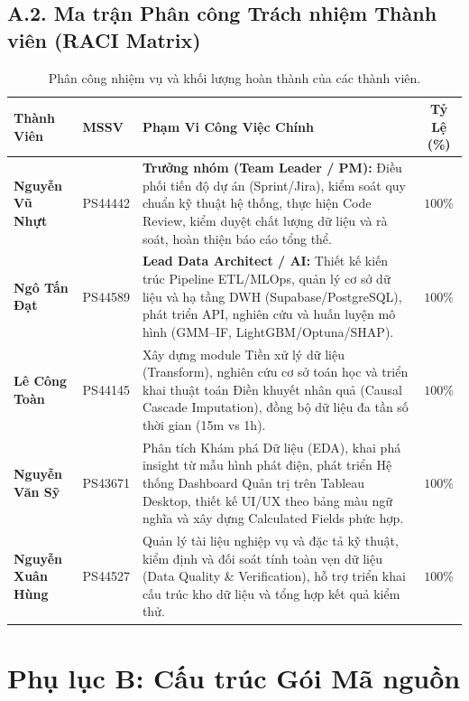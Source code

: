 \documentclass[12pt, a4paper]{report}
\begin{document}
\section*{A.2. Ma trận Phân công Trách nhiệm Thành viên (RACI Matrix)}

\begin{table}[H]
\centering
\small
\renewcommand{\arraystretch}{1}
\begin{tabularx}{\textwidth}{@{} l l X c @{}}
\toprule
\textbf{Thành Viên} & \textbf{MSSV} & \textbf{Phạm Vi Công Việc Chính} & \textbf{Tỷ Lệ (\%)} \\
\midrule
\textbf{Nguyễn Vũ Nhựt} & PS44442 & 
\textbf{Trưởng nhóm (Team Leader / PM):} Điều phối tiến độ dự án (Sprint/Jira), kiểm soát quy chuẩn kỹ thuật hệ thống, thực hiện Code Review, kiểm duyệt chất lượng dữ liệu và rà soát, hoàn thiện báo cáo tổng thể. & 
$100\%$ \\
\midrule
\textbf{Ngô Tấn Đạt} & PS44589 & 
\textbf{Lead Data Architect / AI:} Thiết kế kiến trúc Pipeline ETL/MLOps, quản lý cơ sở dữ liệu và hạ tầng DWH (Supabase/PostgreSQL), phát triển API, nghiên cứu và huấn luyện mô hình (GMM--IF, LightGBM/Optuna/SHAP). & 
$100\%$ \\
\midrule
\textbf{Lê Công Toàn} & PS44145 & 
Xây dựng module Tiền xử lý dữ liệu (Transform), nghiên cứu cơ sở toán học và triển khai thuật toán Điền khuyết nhân quả (Causal Cascade Imputation), đồng bộ dữ liệu đa tần số thời gian (15m vs 1h). & 
$100\%$ \\
\midrule
\textbf{Nguyễn Văn Sỹ} & PS43671 & 
Phân tích Khám phá Dữ liệu (EDA), khai phá insight từ mẫu hình phát điện, phát triển Hệ thống Dashboard Quản trị trên Tableau Desktop, thiết kế UI/UX theo bảng màu ngữ nghĩa và xây dựng Calculated Fields phức hợp. & 
$100\%$ \\
\midrule
\textbf{Nguyễn Xuân Hùng} & PS44527 & 
Quản lý tài liệu nghiệp vụ và đặc tả kỹ thuật, kiểm định và đối soát tính toàn vẹn dữ liệu (Data Quality \& Verification), hỗ trợ triển khai cấu trúc kho dữ liệu và tổng hợp kết quả kiểm thử. & 
$100\%$ \\
\bottomrule
\end{tabularx}
\caption{Phân công nhiệm vụ và khối lượng hoàn thành của các thành viên.}
\label{tab:member_assignment}
\end{table}

\chapter*{Phụ lục B: Cấu trúc Gói Mã nguồn}
\label{app:code}
\end{document}
